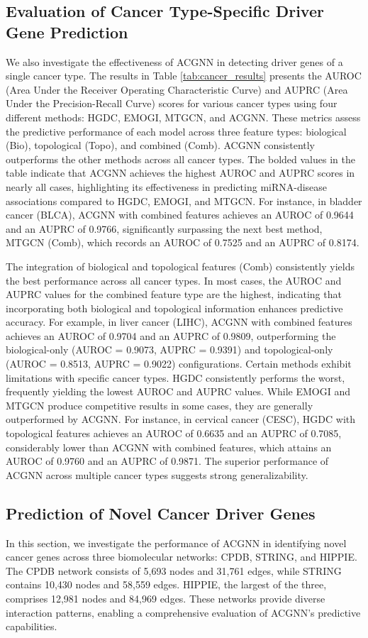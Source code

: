  
\subsection{Evaluation of Cancer Type-Specific Driver Gene Prediction}

We also investigate the effectiveness of ACGNN in detecting driver genes of a single cancer type. The results in Table \ref{tab:cancer_results} presents the AUROC (Area Under the Receiver Operating Characteristic Curve) and AUPRC (Area Under the Precision-Recall Curve) scores for various cancer types using four different methods: HGDC, EMOGI, MTGCN, and ACGNN. These metrics assess the predictive performance of each model across three feature types: biological (Bio), topological (Topo), and combined (Comb).
ACGNN consistently outperforms the other methods across all cancer types. The bolded values in the table indicate that ACGNN achieves the highest AUROC and AUPRC scores in nearly all cases, highlighting its effectiveness in predicting miRNA-disease associations compared to HGDC, EMOGI, and MTGCN. For instance, in bladder cancer (BLCA), ACGNN with combined features achieves an AUROC of 0.9644 and an AUPRC of 0.9766, significantly surpassing the next best method, MTGCN (Comb), which records an AUROC of 0.7525 and an AUPRC of 0.8174.

The integration of biological and topological features (Comb) consistently yields the best performance across all cancer types. In most cases, the AUROC and AUPRC values for the combined feature type are the highest, indicating that incorporating both biological and topological information enhances predictive accuracy. For example, in liver cancer (LIHC), ACGNN with combined features achieves an AUROC of 0.9704 and an AUPRC of 0.9809, outperforming the biological-only (AUROC = 0.9073, AUPRC = 0.9391) and topological-only (AUROC = 0.8513, AUPRC = 0.9022) configurations.
Certain methods exhibit limitations with specific cancer types. HGDC consistently performs the worst, frequently yielding the lowest AUROC and AUPRC values. While EMOGI and MTGCN produce competitive results in some cases, they are generally outperformed by ACGNN. For instance, in cervical cancer (CESC), HGDC with topological features achieves an AUROC of 0.6635 and an AUPRC of 0.7085, considerably lower than ACGNN with combined features, which attains an AUROC of 0.9760 and an AUPRC of 0.9871.
The superior performance of ACGNN across multiple cancer types suggests strong generalizability. 

 
  \subsection{Prediction of Novel Cancer Driver Genes}
  \noindent In this section, we investigate the performance of ACGNN in identifying novel cancer genes across three biomolecular networks: CPDB, STRING, and HIPPIE. The CPDB network consists of 5,693 nodes and 31,761 edges, while STRING contains 10,430 nodes and 58,559 edges. HIPPIE, the largest of the three, comprises 12,981 nodes and 84,969 edges. These networks provide diverse interaction patterns, enabling a comprehensive evaluation of ACGNN’s predictive capabilities.
  
